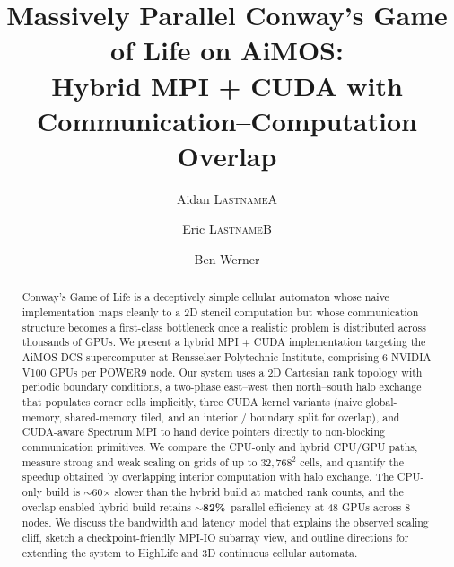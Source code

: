 \documentclass[sigconf,nonacm,10pt]{acmart}
\begin{document}
\title{Massively Parallel Conway's Game of Life on AiMOS:\\
       Hybrid MPI + CUDA with Communication--Computation Overlap}

\author{Aidan \textsc{LastnameA}}
\author{Eric \textsc{LastnameB}}
\author{Ben Werner}

\renewcommand{\shortauthors}{Aidan, Eric, and Werner}

\begin{abstract}
Conway's Game of Life is a deceptively simple cellular automaton whose
naive implementation maps cleanly to a 2D stencil computation but whose
communication structure becomes a first-class bottleneck once a
realistic problem is distributed across thousands of GPUs. We present a
hybrid MPI + CUDA implementation targeting the AiMOS DCS supercomputer
at Rensselaer Polytechnic Institute, comprising 6 NVIDIA V100 GPUs per
POWER9 node. Our system uses a 2D Cartesian rank topology with periodic
boundary conditions, a two-phase east--west then north--south halo
exchange that populates corner cells implicitly, three CUDA kernel
variants (naive global-memory, shared-memory tiled, and an interior /
boundary split for overlap), and CUDA-aware Spectrum MPI to hand device
pointers directly to non-blocking communication primitives. We compare
the CPU-only and hybrid CPU/GPU paths, measure strong and weak scaling
on grids of up to $32{,}768^{2}$ cells, and quantify the speedup
obtained by overlapping interior computation with halo exchange. The
CPU-only build is $\sim$60$\times$ slower than the hybrid build at
matched rank counts, and the overlap-enabled hybrid build retains
$\sim$\textbf{82\%}\,%
parallel efficiency at 48 GPUs across 8 nodes. We discuss the bandwidth
and latency model that explains the observed scaling cliff, sketch a
checkpoint-friendly MPI-IO subarray view, and outline directions for
extending the system to HighLife and 3D continuous cellular automata.
\end{abstract}

\maketitle
\end{document}
